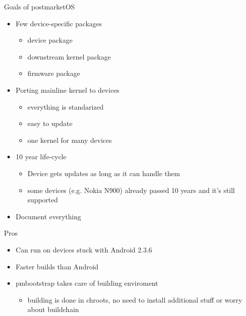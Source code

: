 \documentclass[aspectratio=169]{beamer}
\begin{document}
\begin{frame}{Goals of postmarketOS}
\begin{itemize}
	\item Few device-specific packages
	\begin{itemize}
		\item device package
		\item downstream kernel package
		\item firmware package
	\end{itemize}
	\item Porting mainline kernel to devices
	\begin{itemize}
		\item everything is standarized
		\item easy to update
		\item one kernel for many devices
	\end{itemize}
	\item 10 year life-cycle
	\begin{itemize}
		\item Device gets updates as long as it can handle them
		\item some devices (e.g. Nokia N900) already passed 10 years and it's still supported
	\end{itemize}
	\item Document everything
	
\end{itemize}
\end{frame}

\begin{frame}{Pros}
\begin{itemize}
	\item Can run on devices stuck with Android 2.3.6
	\item Faster builds than Android
	\item pmbootstrap takes care of building enviroment
	\begin{itemize}
		\item building is done in chroots, no need to install additional stuff or worry about buildchain
	\end{itemize}
\end{itemize}
\end{frame}
\end{document}
